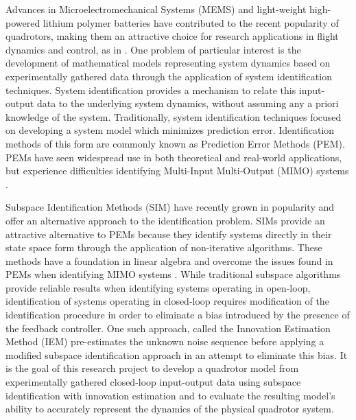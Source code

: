 Advances in Microelectromechanical Systems (MEMS) and light-weight high-powered lithium polymer batteries have contributed to the recent popularity of quadrotors, making them an attractive choice for research applications in flight dynamics and control, as in \cite{hoffmann2007quadrotor, kivrak2006design, mellinger2010control, michael2010grasp}. One problem of particular interest is the development of mathematical models representing system dynamics based on experimentally gathered data through the application of system identification techniques. System identification provides a mechanism to relate this input-output data to the underlying system dynamics, without assuming any a priori knowledge of the system. Traditionally, system identification techniques focused on developing a system model which minimizes prediction error. Identification methods of this form are commonly known as Prediction Error Methods (PEM). PEMs have seen widespread use in both theoretical and real-world applications, but experience difficulties identifying Multi-Input Multi-Output (MIMO) systems \cite{qin2006overview, viberg1995subspace}. 

Subspace Identification Methods (SIM) have recently grown in popularity and offer an alternative approach to the identification problem. SIMs provide an attractive alternative to PEMs because they identify systems directly in their state space form through the application of non-iterative algorithms. These methods have a foundation in linear algebra and overcome the issues found in PEMs when identifying MIMO systems \cite{katayama2005subspace}. While traditional subspace algorithms provide reliable results when identifying systems operating in open-loop, identification of systems operating in closed-loop requires modification of the identification procedure in order to eliminate a bias introduced by the presence of the feedback controller. One such approach, called the Innovation Estimation Method (IEM) pre-estimates the unknown noise sequence before applying a modified subspace identification approach in an attempt to eliminate this bias. It is the goal of this research project to develop a quadrotor model from experimentally gathered closed-loop input-output data using subspace identification with innovation estimation and to evaluate the resulting model's ability to accurately represent the dynamics of the physical quadrotor system.


